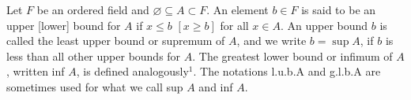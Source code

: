 Let $F$ be an ordered field and $\varnothing \subseteq A \subset F$. An element $b \in F$ is said to be an upper [lower] bound for $A$ if $x \leq b$ $[x \geq b]$ for all $x \in A$. An upper bound $b$ is called the least upper bound or supremum of $A$, and we write $b = \sup A$, if $b$ is less than all other upper bounds for $A$. The greatest lower bound or infimum of $A$, written inf $A$, is defined analogously$^1$. The notations l.u.b.A and g.l.b.A are sometimes used for what we call sup $A$ and inf $A$.
